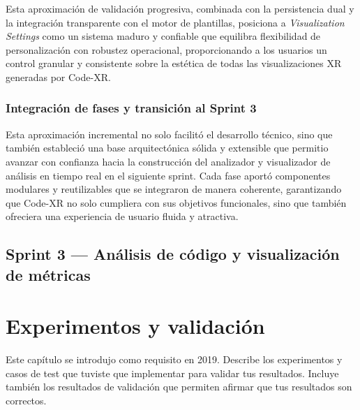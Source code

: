 \documentclass[a4paper, 12pt]{book}
\begin{document}
Esta aproximación de validación progresiva, combinada con la persistencia dual y la integración transparente con el motor de plantillas, posiciona a \emph{Visualization Settings} como un sistema maduro y confiable que equilibra flexibilidad de personalización con robustez operacional, proporcionando a los usuarios un control granular y consistente sobre la estética de todas las visualizaciones XR generadas por Code-XR.

\subsection{Integración de fases y transición al Sprint 3}
Esta aproximación incremental no solo facilitó el desarrollo técnico, sino que también estableció una base arquitectónica sólida y extensible que permitio avanzar con confianza hacia la construcción del analizador y visualizador de análisis en tiempo real en el siguiente sprint. Cada fase aportó componentes modulares y reutilizables que se integraron de manera coherente, garantizando que Code-XR no solo cumpliera con sus objetivos funcionales, sino que también ofreciera una experiencia de usuario fluida y atractiva.

\section{Sprint 3 — Análisis de código y visualización de métricas}

%

\cleardoublepage
\chapter{Experimentos y validación}
\label{chap:experimentos}

Este capítulo se introdujo como requisito en 2019. 
Describe los experimentos y casos de test que tuviste que implementar para validar tus resultados. 
Incluye también los resultados de validación que permiten afirmar que tus resultados son correctos. 


\end{document}
